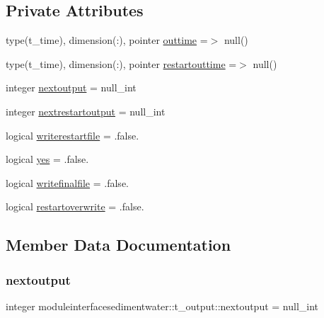 \subsection*{Private Attributes}
\begin{DoxyCompactItemize}
\item 
type(t\+\_\+time), dimension(\+:), pointer \mbox{\hyperlink{structmoduleinterfacesedimentwater_1_1t__output_ae1414f4609f8b8d561216ee5314e6c92}{outtime}} =$>$ null()
\item 
type(t\+\_\+time), dimension(\+:), pointer \mbox{\hyperlink{structmoduleinterfacesedimentwater_1_1t__output_a995a58a83575a2f29e3bc82b3a48d8ea}{restartouttime}} =$>$ null()
\item 
integer \mbox{\hyperlink{structmoduleinterfacesedimentwater_1_1t__output_af0ccbb02813aa87bbd7049a10375c3fe}{nextoutput}} = null\+\_\+int
\item 
integer \mbox{\hyperlink{structmoduleinterfacesedimentwater_1_1t__output_a209a2cd9af67950389d0786372ab84f2}{nextrestartoutput}} = null\+\_\+int
\item 
logical \mbox{\hyperlink{structmoduleinterfacesedimentwater_1_1t__output_ab143646770fac945fd4dcc6a07ae7fdd}{writerestartfile}} = .false.
\item 
logical \mbox{\hyperlink{structmoduleinterfacesedimentwater_1_1t__output_a0347e410d9b52c6285a6ff350b489e37}{yes}} = .false.
\item 
logical \mbox{\hyperlink{structmoduleinterfacesedimentwater_1_1t__output_aadb46ec56eaef5b8c74531dccb9bf590}{writefinalfile}} = .false.
\item 
logical \mbox{\hyperlink{structmoduleinterfacesedimentwater_1_1t__output_af2c23d1b2e5799d5231c1f08fc07c3bf}{restartoverwrite}} = .false.
\end{DoxyCompactItemize}


\subsection{Member Data Documentation}
\mbox{\label{structmoduleinterfacesedimentwater_1_1t__output_af0ccbb02813aa87bbd7049a10375c3fe}} 
\subsubsection{\texorpdfstring{nextoutput}{nextoutput}}
{\footnotesize\ttfamily integer moduleinterfacesedimentwater\+::t\+\_\+output\+::nextoutput = null\+\_\+int\hspace{0.3cm}{\ttfamily [private]}}

